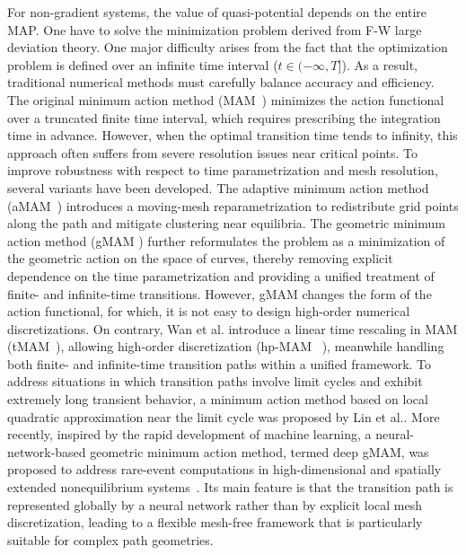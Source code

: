 \documentclass[a4paper,fleqn, 12pt]{cas-sc}
\numberwithin{table}{section}
\begin{document}
For non-gradient systems, the value of quasi-potential depends on the entire MAP. One have to solve the minimization problem derived from F-W large deviation theory. 
One major difficulty arises from the fact that the  optimization problem is defined over an infinite time interval ($t \in (-\infty, T]$). As a result, traditional numerical methods must carefully balance accuracy and efficiency. The original minimum action method (MAM~\cite{e_minimum_2004}) minimizes the action functional over a truncated finite time interval, which requires prescribing the integration time in advance. However, when the optimal transition time tends to infinity, this approach often suffers from severe resolution issues near critical points. To improve robustness with respect to time parametrization and mesh resolution, several variants have been developed. The adaptive minimum action method (aMAM~\cite{zhou2008adaptive})  introduces a moving-mesh reparametrization to redistribute grid points along the path and mitigate clustering near equilibria. The geometric minimum action method (gMAM \cite{heymann_geometric_2008, VandeH2008GeometricMinimum,grafke2017long}) further reformulates the problem as a minimization of the geometric action on the space of curves, thereby removing explicit dependence on the time parametrization and providing a unified treatment of finite- and infinite-time transitions. However, gMAM changes the form of the action functional, for which, it is not easy to design high-order numerical discretizations. On contrary, Wan et al. introduce a  linear time rescaling in MAM (tMAM~\cite{wan_minimum_2015,wan_convergence_2018}), allowing high-order discretization (hp-MAM~ \cite{wan2018hp}), meanwhile handling both finite- and infinite-time transition paths within a unified framework. 
To address situations in which transition paths involve limit cycles and exhibit extremely long transient behavior, a minimum action method based on local quadratic approximation near the limit cycle was proposed by Lin et al.\cite{lin_quasi-potential_2019}. More recently, inspired by the rapid development of machine learning, a neural-network-based geometric minimum action method, termed deep gMAM, was proposed to address rare-event computations in high-dimensional and spatially extended nonequilibrium systems~\cite{simonnet2023computing}. Its main feature is that the transition path is represented globally by a neural network rather than by explicit local mesh discretization, leading to a flexible mesh-free framework that is particularly suitable for complex path geometries. 
\end{document}
